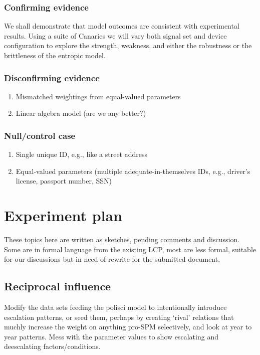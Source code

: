 \documentclass{article} %
\begin{document}
\subsubsection{Confirming evidence}
We shall demonstrate that model outcomes are consistent with experimental results. Using a suite of Canaries we will vary both signal set and device configuration to explore the strength, weakness, and either the robustness or the brittleness of the entropic model. 

\subsubsection{Disconfirming evidence}
\begin{enumerate}
\item Mismatched weightings from equal-valued parameters
\item Linear algebra model (are we any better?)
\end{enumerate}

\subsubsection{Null/control case}
\begin{enumerate}
\item Single unique ID, e.g., like a street address
\item Equal-valued parameters (multiple adequate-in-themselves IDs, e.g., driver's license, passport number, SSN)
\end{enumerate}

\pagebreak
\section{Experiment plan}

These topics here are written as sketches, pending comments and discussion. Some are in formal language from the existing LCP, most are less formal, suitable for our discussions but in need of rewrite for the submitted document.

\subsection{Reciprocal influence}
Modify the data sets feeding the polisci model to intentionally introduce escalation patterns, or seed them, perhaps by creating `rival' relations that muchly increase the weight on anything pro-SPM selectively, and look at year to year patterns. Mess with the parameter values to show escalating and deescalating factors/conditions.
\end{document}
